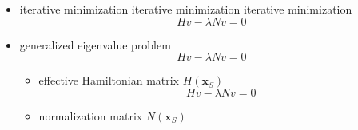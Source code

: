 \documentclass[10pt]{beamer}
\begin{document}
\begin{frame}
\begin{itemize}
\setlength\abovedisplayskip{20pt}
\setlength\belowdisplayskip{20pt}
\setlength\abovedisplayshortskip{20pt}
\setlength\belowdisplayshortskip{20pt}
\item iterative minimization iterative minimization iterative minimization
\begin{equation}
Hv-\lambda Nv = 0
\end{equation}
\item generalized eigenvalue problem
\begin{equation}
Hv-\lambda Nv = 0
\end{equation}
\begin{itemize}
\setlength\abovedisplayskip{20pt}
\setlength\belowdisplayskip{20pt}
\setlength\abovedisplayshortskip{20pt}
\setlength\belowdisplayshortskip{20pt}
\item effective Hamiltonian matrix $H(\mathbf{x}_S)$ 
\begin{equation}
Hv-\lambda Nv = 0
\end{equation}
\item normalization matrix $N(\mathbf{x}_S)$
\end{itemize}
\end{itemize}
\end{frame}
\end{document}
